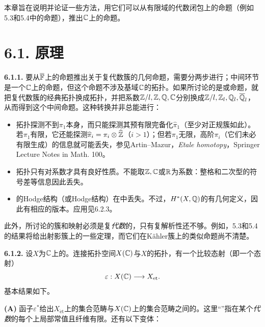 本章旨在说明并论证一些方法，用它们可以从有限域的代数闭包上的命题（例如5.3和5.4中的命题），推出$\mathbb C$上的命题。

\section*{6.1. 原理}
\par\medskip\noindent\textbf{6.1.1.} 要从$\overline{\mathbb F}$上的命题推出关于复代数簇的几何命题，需要分两步进行；中间环节是一个$\mathbb C$上的命题，但这个命题不涉及基域$\mathbb C$的拓扑。如果所讨论的是或命题，就把复代数簇的经典拓扑换成拓扑，并把系数$\mathbb Z/l,\mathbb Z,\mathbb Q,\mathbb C$分别换成$\mathbb Z/l,\mathbb Z_l,\mathbb Q_l,\overline{\mathbb Q}_l$，从而得到这个中间命题。这种转换并非总能进行：
\begin{itemize}
\item {}拓扑探测不到$\pi_1$本身，而只能探测其预有限完备化$\widehat{\pi}_1$（至少对正规簇如此）。若$\pi_1$有限，它还能探测$\widehat{\pi}_i=\pi_i\otimes\widehat{\mathbb Z}$（$i>1$）；但若$\pi_1$无限，高阶$\pi_i$（它们未必有限生成）的信息就可能丢失，参见Artin--Mazur，\emph{Etale homotopy}，Springer Lecture Notes in Math. 100。
\item {}拓扑只有对系数才具有良好性质。不能取$\mathbb Z,\mathbb C$或$\mathbb R$为系数：整格和二次型的符号差等信息因此丢失。
\item {}的Hodge结构（或Hodge结构）在中丢失。不过，$H^*(X,\mathbb Q)$的有几何定义，因此有相应的版本。应用见6.2.3。
\end{itemize}
此外，所讨论的簇和映射必须是复\emph{代数}的，只有复解析性还不够。例如，5.3和5.4的结果将给出射影簇上的一些定理，而它们在Kähler簇上的类似命题尚不清楚。

\par\medskip\noindent\textbf{6.1.2.} 设$X$为$\mathbb C$上的。连接拓扑空间$X(\mathbb C)$与$X$的拓扑，有一个比较态射（即一个态射）
\[
\varepsilon:X(\mathbb C)\longrightarrow X_{\mathrm{\relax et}}.
\]
基本结果如下。

\noindent\textbf{(A)} 函子$\varepsilon^*$给出$X_{\mathrm{\acute et}}$上的集合范畴与$X(\mathbb C)$上的集合范畴之间的。这里“”指在某个\emph{代数}的每个上局部常值且纤维有限。还有以下变体：

